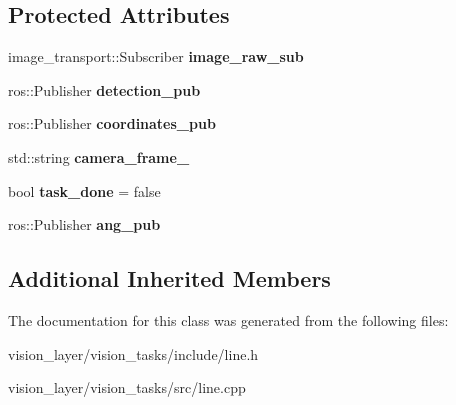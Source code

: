 \subsection*{Protected Attributes}
\begin{DoxyCompactItemize}
\item 
\mbox{\label{classLine_a7baec58f43b0596a630e086591e4e072}} 
image\+\_\+transport\+::\+Subscriber {\bfseries image\+\_\+raw\+\_\+sub}
\item 
\mbox{\label{classLine_ae41bf70d070b2abcca4e8d289a86b85a}} 
ros\+::\+Publisher {\bfseries detection\+\_\+pub}
\item 
\mbox{\label{classLine_adecc2f839c1de6c5e6f5baff29951db9}} 
ros\+::\+Publisher {\bfseries coordinates\+\_\+pub}
\item 
\mbox{\label{classLine_a61ee6db6c19464de515c754cf8a99731}} 
std\+::string {\bfseries camera\+\_\+frame\+\_\+}
\item 
\mbox{\label{classLine_a6139a8ba5889f7e4384dddf05b5f83d2}} 
bool {\bfseries task\+\_\+done} = false
\item 
\mbox{\label{classLine_a6f522c0976cbe9b76bfbe89fa423ce25}} 
ros\+::\+Publisher {\bfseries ang\+\_\+pub}
\end{DoxyCompactItemize}
\subsection*{Additional Inherited Members}


The documentation for this class was generated from the following files\+:\begin{DoxyCompactItemize}
\item 
vision\+\_\+layer/vision\+\_\+tasks/include/line.\+h\item 
vision\+\_\+layer/vision\+\_\+tasks/src/line.\+cpp\end{DoxyCompactItemize}
